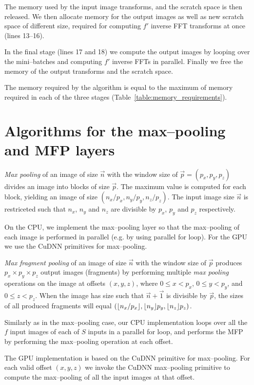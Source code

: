 \documentclass[conference]{IEEEtran}
\DeclarePairedDelimiter{\floor}{\lfloor}{\rfloor}
\begin{document}
  The memory used by the input image transforms, and the scratch space
  is then released.  We then allocate memory for the output images as
  well as new scratch space of different size, required for computing
  $f'$ inverse FFT transforms at once (lines 13--16).

  In the final stage (lines 17 and 18) we compute the output images by
  looping over the mini--batches and computing $f'$ inverse FFTs in
  parallel.  Finally we free the memory of the output transforms and
  the scratch space.

  The memory required by the algorithm is equal to the maximum of
  memory required in each of the three stages
  (Table~\ref{table:memory_requirements}).

\section{Algorithms for the max--pooling and MFP layers}

  \emph{Max pooling} of an image of size $\vec{n}$ with the window
  size of $\vec{p} = (p_x,p_y,p_z)$ divides an image into blocks of
  size $\vec{p}$.  The maximum value is computed for each block,
  yielding an image of size $(n_x/p_x,n_y/p_y,n_z/p_z)$.  The input
  image size $\vec{n}$ is restriceted such that $n_x$, $n_y$ and $n_z$
  are divisible by $p_x$, $p_y$ and $p_z$ respectively.

  On the CPU, we implement the max--pooling layer so that the
  max--pooling of each image is performed in parallel (e.g. by using
  parallel for loop).  For the GPU we use the CuDNN primitives for
  max--pooling.

  \emph{Max fragment pooling} of an image of size $\vec{n}$ with the
  window size of $\vec{p}$ produces $p_x \times p_y \times p_z$ output
  images (fragments) by performing multiple \emph{max pooling}
  operations on the image at offsets $(x,y,z)$, where $0 \le x < p_x$,
  $0 \le y < p_y$, and $0 \le z < p_z$.  When the image has size such
  that $\vec{n} + \vec{1}$ is divisible by $\vec{p}$, the sizes of all
  produced fragments will equal
  $(\floor{n_x/p_x},\floor{n_y}{p_y},\floor{n_z}{p_z})$.

  Similarly as in the max--pooling case, our CPU implementation loops
  over all the $f$ input images of each of $S$ inputs in a parallel
  for loop, and performs the MFP by performing the
  max--pooling operation at each offset.

  The GPU implementation is based on the CuDNN primitive for
  max--pooling.  For each valid offset $(x,y,z)$ we invoke the CuDNN
  max--pooling primitive to compute the max--pooling of all the input
  images at that offset.
\end{document}
